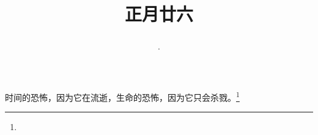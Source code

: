 \title{\date[d=6,m=3,y=2024][year:cn-y,年,month:cn,day:cn,日,·,weekday]·正月廿六 }
时间的恐怖，因为它在流逝，生命的恐怖，因为它只会杀戮。\footnote{ }

